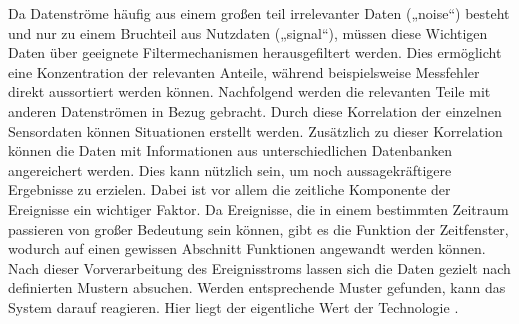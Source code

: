 Da Datenströme häufig aus einem großen teil irrelevanter Daten („noise“) besteht und nur zu einem Bruchteil aus Nutzdaten („signal“), müssen diese Wichtigen Daten über geeignete Filtermechanismen herausgefiltert werden. Dies ermöglicht eine Konzentration der relevanten Anteile, während beispielsweise Messfehler direkt aussortiert werden können. Nachfolgend werden die relevanten Teile mit anderen Datenströmen in Bezug gebracht. Durch diese Korrelation der einzelnen Sensordaten können Situationen erstellt werden. Zusätzlich zu dieser Korrelation können die Daten mit Informationen aus unterschiedlichen Datenbanken angereichert werden. Dies kann nützlich sein, um noch aussagekräftigere Ergebnisse zu erzielen. Dabei ist vor allem die zeitliche Komponente der Ereignisse ein wichtiger Faktor. Da Ereignisse, die in einem bestimmten Zeitraum passieren von großer Bedeutung sein können, gibt es die Funktion der Zeitfenster, wodurch auf einen gewissen Abschnitt Funktionen angewandt werden können. Nach dieser Vorverarbeitung des Ereignisstroms lassen sich die Daten gezielt nach definierten Mustern absuchen. Werden entsprechende Muster gefunden, kann das System darauf reagieren. Hier liegt der eigentliche Wert der Technologie \cite{Bruening.2016}.



\ifCLASSOPTIONcaptionsoff
  \newpage
\fi